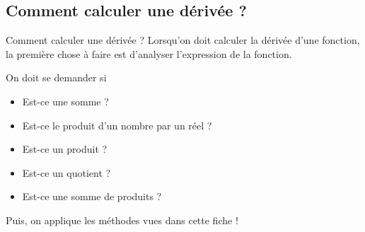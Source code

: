 \documentclass[12pt]{beamer}
\begin{document}
\subsection{Comment calculer une dérivée ?}

\begin{frame}{Comment calculer une dérivée ?}
Lorsqu'on doit calculer la dérivée d'une fonction, la première chose à faire est d'analyser l'expression de la fonction.

\medskip

On doit se demander si 

\begin{itemize}
\item Est-ce une somme ? 
\item Est-ce le produit d'un nombre par un réel ?
\item Est-ce un produit ? 
\item Est-ce un quotient ? 
\item Est-ce une somme de produits ? 
\end{itemize}

\medskip

Puis, on applique les méthodes vues dans cette fiche !

\end{frame}
\end{document}
